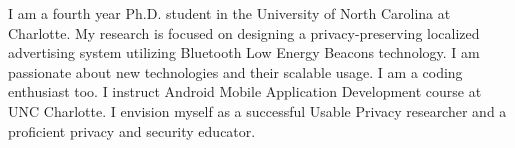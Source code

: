 %
%
%
\par{
I am a fourth year Ph.D. student in the University of North Carolina at Charlotte. My research is focused on designing a privacy-preserving localized advertising system utilizing Bluetooth Low Energy Beacons technology. I am passionate about new technologies and their scalable usage. I am a coding enthusiast too. I instruct Android Mobile Application Development course at UNC Charlotte. I envision myself as a successful Usable Privacy researcher and a proficient privacy and security educator.
}